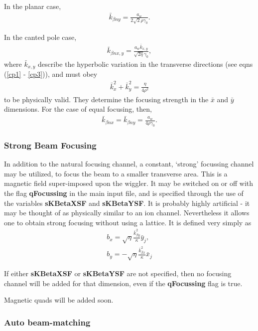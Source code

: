 \documentclass[12pt]{article}%
\begin{document}
In the planar case,
\begin{align}
\bar{k}_{\beta n y} = \frac{a_w}{2 \sqrt{2} \rho \gamma_0}.
\end{align}

In the canted pole case,
\begin{align}
\bar{k}_{\beta n x,y} = \frac{a_w \bar{k}_{x,y}}{\sqrt{2 \eta} \gamma_0},
\end{align}
where $\bar{k}_{x,y}$ describe the hyperbolic variation in the transverse directions (see eqns (\ref{cp1} - \ref{cp3})), and must obey
\begin{align}
\bar{k}_x^2 + \bar{k}_y^2 = \frac{\eta}{4 \rho^2}
\end{align}
to be physically valid. They determine the focusing strength in the $\bar{x}$ and $\bar{y}$ dimensions. For the case of equal focusing, then,
\begin{align}
\bar{k}_{\beta n x} = \bar{k}_{\beta n y} = \frac{a_w }{ 4 \rho \gamma_0}.
\end{align}



\subsubsection{Strong Beam Focusing}

In addition to the natural focusing channel, a constant, `strong' focussing channel may be utilized, to focus the beam to a smaller transverse area. This is a magnetic field super-imposed upon the wiggler. It may be switched on or off with the flag {\bf qFocussing} in the main input file, and is specified through the use of the variables {\bf sKBetaXSF} and {\bf sKBetaYSF}. It is probably highly artificial - it may be thought of as physically similar to an ion channel. Nevertheless it allows one to obtain strong focusing without using a lattice. It is defined very simply as
\begin{align}
b_x = \sqrt{\eta} \frac{\bar{k}_{\beta y}^2}{\kappa}\bar{y}_j, \\
b_y = - \sqrt{\eta} \frac{\bar{k}_{\beta x}^2}{\kappa}\bar{x}_j
\end{align}

If either {\bf sKBetaXSF} or {\bf sKBetaYSF} are not specified, then no focusing channel will be added for that dimension, even if the {\bf qFocussing} flag is true.

Magnetic quads will be added soon.


\subsubsection{Auto beam-matching}
\end{document}
